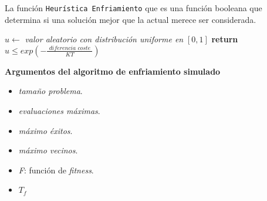 La función \texttt{Heurística Enfriamiento} 
que es una función booleana que determina si una solución mejor que la actual merece ser considerada. 

\begin{algorithm}[H]
  \begin{algorithmic}
      \State $u \gets$ \textit{valor aleatorio con distribución uniforme en }$[0,1]$ 
      \State \textbf{return } 
      $u \leq exp( -\frac{\textit{ diferencia coste }}{K T})$
    \EndProcedure
  \end{algorithmic}  
\end{algorithm} 


\textbf{Argumentos del algoritmo de enfriamiento simulado}
\begin{itemize}
  \item \textit{tamaño problema}.
  \item \textit{evaluaciones máximas}.
  \item \textit{máximo éxitos}.
  \item \textit{máximo vecinos}. 
  \item \textit{F}: función de \textit{fitness}.
  \item $T_f$
\end{itemize}


